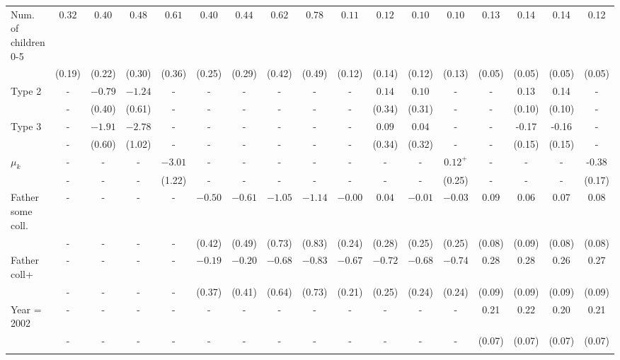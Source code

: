 \begin{tabular}{lcccccccccccccccc}
Num. of children 0-5&$0.32$&$0.40$&$0.48$&$0.61$&$0.40$&$0.44$&$0.62$&$0.78$&$0.11$&$0.12$&$0.10$&$0.10$&0.13&0.14&0.14&0.12\\
&(0.19)&(0.22)&(0.30)&(0.36)&(0.25)&(0.29)&(0.42)&(0.49)&(0.12)&(0.14)&(0.12)&(0.13)&(0.05)&(0.05)&(0.05)&(0.05)\\
Type 2&-&$-0.79$&$-1.24$&-&-&-&-&-&-&$0.14$&$0.10$&-&-&0.13&0.14&-\\
&-&(0.40)&(0.61)&-&-&-&-&-&-&(0.34)&(0.31)&-&-&(0.10)&(0.10)&-\\
Type 3&-&$-1.91$&$-2.78$&-&-&-&-&-&-&$0.09$&$0.04$&-&-&-0.17&-0.16&-\\
&-&(0.60)&(1.02)&-&-&-&-&-&-&(0.34)&(0.32)&-&-&(0.15)&(0.15)&-\\
$\mu_{k}$&-&-&-&$-3.01$&-&-&-&-&-&-&-&$0.12^{+}$&-&-&-&-0.38\\
&-&-&-&(1.22)&-&-&-&-&-&-&-&(0.25)&-&-&-&(0.17)\\
Father some coll.&-&-&-&-&$-0.50$&$-0.61$&$-1.05$&$-1.14$&$-0.00$&$0.04$&$-0.01$&$-0.03$&0.09&0.06&0.07&0.08\\
&-&-&-&-&(0.42)&(0.49)&(0.73)&(0.83)&(0.24)&(0.28)&(0.25)&(0.25)&(0.08)&(0.09)&(0.08)&(0.08)\\
Father coll+&-&-&-&-&$-0.19$&$-0.20$&$-0.68$&$-0.83$&$-0.67$&$-0.72$&$-0.68$&$-0.74$&0.28&0.28&0.26&0.27\\
&-&-&-&-&(0.37)&(0.41)&(0.64)&(0.73)&(0.21)&(0.25)&(0.24)&(0.24)&(0.09)&(0.09)&(0.09)&(0.09)\\
Year = 2002&-&-&-&-&-&-&-&-&-&-&-&-&0.21&0.22&0.20&0.21\\
&-&-&-&-&-&-&-&-&-&-&-&-&(0.07)&(0.07)&(0.07)&(0.07)\\
\\
\bottomrule\end{tabular}